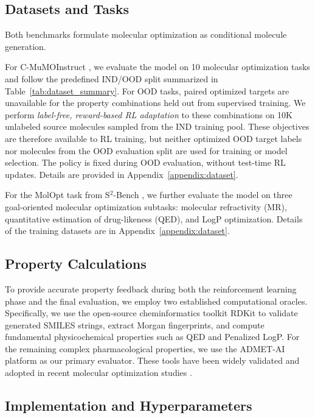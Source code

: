 \documentclass[11pt]{article}
\begin{document}
\subsection{Datasets and Tasks}
Both benchmarks formulate molecular optimization as conditional molecule generation.

For C-MuMOInstruct \cite{dey2025large}, we evaluate the model on 10 molecular optimization tasks and follow the predefined IND/OOD split summarized in Table~\ref{tab:dataset_summary}. 
For OOD tasks, paired optimized targets are unavailable for the property combinations held out from supervised training. We perform \emph{label-free, reward-based RL adaptation} to these combinations on 10K unlabeled source molecules sampled from the IND training pool. These objectives are therefore available to RL training, but neither optimized OOD target labels nor molecules from the OOD evaluation split are used for training or model selection. The policy is fixed during OOD evaluation, without test-time RL updates. 
Details are provided in Appendix~\ref{appendix:dataset}.


For the MolOpt task from S$^2$-Bench \cite{li2025speaktostructureevaluatingllmsopendomain}, we further evaluate the model on three goal-oriented molecular optimization subtasks: molecular refractivity (MR), quantitative estimation of drug-likeness (QED), and LogP optimization. Details of the training datasets are in Appendix~\ref{appendix:dataset}.



\subsection{Property Calculations}

To provide accurate property feedback during both the reinforcement learning phase and the final evaluation, we employ two established computational oracles. Specifically, we use the open-source cheminformatics toolkit RDKit \cite{landrum2013rdkit} to validate generated SMILES strings, extract Morgan fingerprints, and compute fundamental physicochemical properties such as QED and Penalized LogP. For the remaining complex pharmacological properties, we use the ADMET-AI platform \cite{swanson2024admet} as our primary evaluator. These tools have been widely validated and adopted in recent molecular optimization studies \cite{averly-etal-2025-liddia, Zholus_Kuznetsov_Schutski_Shayakhmetov_Polykovskiy_Chandar_Zhavoronkov_2025, zheng2025large}. 

\subsection{Implementation and Hyperparameters}
\end{document}
